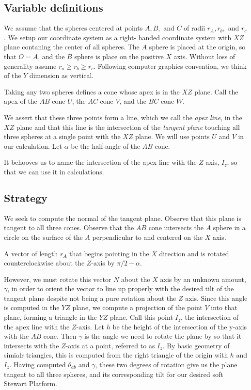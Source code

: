 \documentclass{article}
\begin{document}
\subsection{Variable definitions}

We assume that the spheres centered at points $A,B,$ and $C$
of radii $r_A,r_b,$ and $r_c$. We setup our coordinate system as a right-
handed coordinate system with $XZ$ plane contaning the center of all spheres.
The $A$ sphere is placed at the origin, so that $O = A$, and the $B$ sphere
is place on the positive $X$ axis. Without loss of generality assume $r_a \geq r_b \geq r_c$.
Following computer graphics convention, we think of the $Y$ dimension as vertical.

Taking any two spheres defines a cone whose apex is in the $XZ$ plane.
Call the apex of the $AB$ cone $U$, the $AC$ cone $V$, and the $BC$ cone $W$.

We assert that these three points form a line, which we call the {\em apex line}, in the $XZ$ plane and that this
line is the intersection of the {\em tangent plane} touching all three spheres at a single point
with the $XZ$ plane. We will use points $U$ and $V$ in our calculation.
Let $\alpha$ be the half-angle of the $AB$ cone.

It behooves us to name the intersection of the apex line with the $Z$ axis, $I_z$, so
that we can use it in calculations.

\subsection{Strategy}

We seek to compute the normal of the tangent plane.
Observe that this plane is tangent to all three cones.
Observe that the $AB$ cone intersects
the $A$ sphere in a circle on the surface of the $A$ perpendicular to and centered on the $X$ axis.

A vector of length $r_A$ that begins pointing in the $X$ direction and is rotated counterclockwise
about the $Z$-axis by $\pi/2 - \alpha$.

However, we must rotate this vector $N$ about the $X$ axis by an unknown amount, $\gamma$, in order
to orient the vector to line up properly with the desired tilt of the tangent plane despite not being a pure rotation about the $Z$ axis. Since this angle is computed in the $YZ$ plane, we compute a projection of the point $V$ into
that plane, forming a triangle in the $YZ$ plane.  Call this point $I_z$, the intersection
of the apex line with the $Z$-axis. Let $h$ be the height of the intersection of the y-axis with the $AB$ cone.
Then $\gamma$ is the angle we need to rotate the plane by so that it intersects with the $Z$-axis at a point, referred to as $I_z$. By basic geometry of simialr triangles, this is computed from the right triangle of the origin with $h$ and $I_z$.
Having computed $\theta_{ab}$ and $\gamma$, these two degrees of rotation give us the plane tangent to all three spheres, and its corresponding tilt for our desired soft Stewart Platform.
\end{document}
